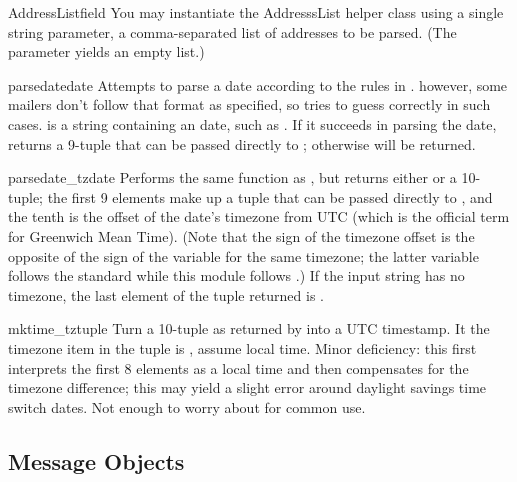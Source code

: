 \begin{classdesc}{AddressList}{field}
You may instantiate the AddresssList helper class using a single
string parameter, a comma-separated list of  addresses to be
parsed.  (The parameter  yields an empty list.)
\end{classdesc}

\begin{funcdesc}{parsedate}{date}
Attempts to parse a date according to the rules in .
however, some mailers don't follow that format as specified, so
 tries to guess correctly in such cases. 
 is a string containing an  date, such as 
.  If it succeeds in parsing
the date,  returns a 9-tuple that can be passed
directly to ; otherwise  will be
returned.  
\end{funcdesc}

\begin{funcdesc}{parsedate_tz}{date}
Performs the same function as , but returns
either  or a 10-tuple; the first 9 elements make up a tuple
that can be passed directly to , and the tenth
is the offset of the date's timezone from UTC (which is the official
term for Greenwich Mean Time).  (Note that the sign of the timezone
offset is the opposite of the sign of the 
variable for the same timezone; the latter variable follows the
\POSIX{} standard while this module follows .)  If the input
string has no timezone, the last element of the tuple returned is
.
\end{funcdesc}

\begin{funcdesc}{mktime_tz}{tuple}
Turn a 10-tuple as returned by  into a UTC
timestamp.  It the timezone item in the tuple is , assume
local time.  Minor deficiency: this first interprets the first 8
elements as a local time and then compensates for the timezone
difference; this may yield a slight error around daylight savings time
switch dates.  Not enough to worry about for common use.
\end{funcdesc}

\subsection{Message Objects}
\label{message-objects}

